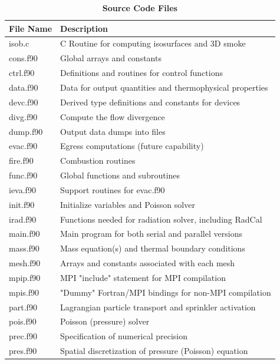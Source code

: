 \documentclass[11pt]{book}
\begin{document}
\begin{table}[ht]
\begin{center}
\caption{\bf Source Code Files}
\label{tab:sourcefiles}
\vspace{.1in}
\begin{tabular}{|l|l|}
\hline
File Name  & Description  \\ \hline \hline
isob.c     & C Routine for computing isosurfaces and 3D smoke \\ \hline \hline
cons.f90   & Global arrays and constants \\ \hline
ctrl.f90   & Definitions and routines for control functions \\ \hline
data.f90   & Data for output quantities and thermophysical properties\\ \hline
devc.f90   & Derived type definitions and constants for devices \\ \hline
divg.f90   & Compute the flow divergence \\ \hline
dump.f90   & Output data dumps into files \\ \hline
evac.f90   & Egress computations (future capability) \\ \hline
fire.f90   & Combustion routines \\ \hline
func.f90   & Global functions and subroutines \\ \hline
ieva.f90   & Support routines for evac.f90 \\ \hline
init.f90   & Initialize variables and Poisson solver \\ \hline
irad.f90   & Functions needed for radiation solver, including RadCal \\ \hline
main.f90   & Main program for both serial and parallel versions \\ \hline
mass.f90   & Mass equation(s) and thermal boundary conditions \\ \hline
mesh.f90   & Arrays and constants associated with each mesh \\ \hline
mpip.f90   & MPI "include" statement for MPI compilation \\ \hline
mpis.f90   & "Dummy" Fortran/MPI bindings for non-MPI compilation \\ \hline
part.f90   & Lagrangian particle transport and sprinkler activation \\ \hline
pois.f90   & Poisson (pressure) solver \\ \hline
prec.f90   & Specification of numerical precision \\ \hline
pres.f90   & Spatial discretization of pressure (Poisson) equation \\ \hline

\end{tabular}
\end{center}
\end{table}
\end{document}
